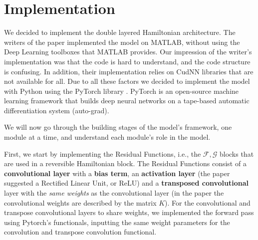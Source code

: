 \documentclass{article}
\theoremstyle{remark}
\begin{document}
\section*{Implementation}
    We decided to implement the double layered Hamiltonian architecture. The writers of the paper implemented the model on MATLAB, without using the Deep Learning toolboxes that MATLAB 
provides. Our impression of the writer's implementation was that the code is hard to understand, and the code structure is confusing. In addition, their implementation relies on CudNN 
libraries that are not available for all. Due to all these factors we decided to implement the model with Python using the PyTorch library \cite{pytorch}. PyTorch is an open-source machine learning 
framework that builds deep neural networks on a tape-based automatic differentiation system (auto-grad). \par
    We will now go through the building stages of the model's framework, one module at a time, and understand each module's role in the model.\par
    First, we start by implementing the Residual Functions, i.e., the $\mathcal{F},\mathcal{G}$ blocks that are used in a reversible Hamiltonian block. The Residual Functions consist of a 
\textbf{convolutional layer} with a \textbf{bias term}, an \textbf{activation layer} (the paper suggested a Rectified Linear Unit, or ReLU) and a \textbf{transposed convolutional} layer 
with the \textit{same weights} as the convolutional layer (in the paper the convolutional weights are described by the matrix $K$). For the convolutional and transpose convolutional layers 
to share weights, we implemented the forward pass using Pytorch's functionals, inputting the same weight parameters for the convolution and transpose convolution functional.\par
\end{document}

